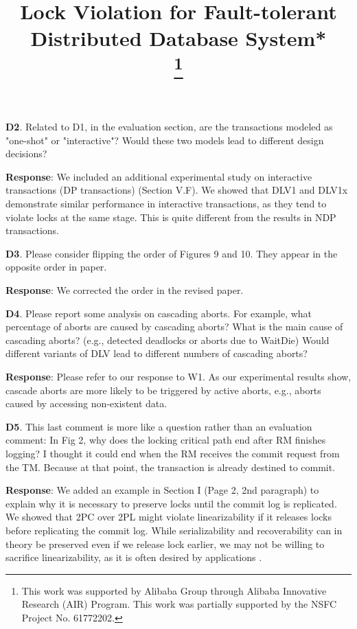 \documentclass[conference]{IEEEtran}
\begin{document}
\begin{frame}{\relax}
\textbf{D2}. Related to D1, in the evaluation section, are the transactions modeled as "one-shot" or "interactive"? Would these two models lead to different design decisions?

\textbf{Response}: We included an additional experimental study on interactive transactions (DP transactions) (Section V.F). We showed that DLV1 and DLV1x demonstrate similar performance in interactive transactions, as they tend to violate locks at the same stage. This is quite different from the results in NDP transactions.

\textbf{D3}. Please consider flipping the order of Figures 9 and 10. They appear in the opposite order in paper.

\textbf{Response}: We corrected the order in the revised paper.

\textbf{D4}. Please report some analysis on cascading aborts. For example, what percentage of aborts are caused by cascading aborts? What is the main cause of cascading aborts? (e.g., detected deadlocks or aborts due to WaitDie) Would different variants of DLV lead to different numbers of cascading aborts?

\textbf{Response}: Please refer to our response to W1. As our experimental results show, cascade aborts are more likely to be triggered by active aborts, e.g., aborts caused by accessing non-existent data. 

\textbf{D5}. This last comment is more like a question rather than an evaluation comment: In Fig 2, why does the locking critical path end after RM finishes logging? I thought it could end when the RM receives the commit request from the TM. Because at that point, the transaction is already destined to commit.

\textbf{Response}: We added an example in Section I (Page 2, 2nd paragraph) to explain why it is necessary to preserve locks until the commit log is replicated. We showed that 2PC over 2PL might violate linearizability if it releases locks before replicating the commit log. While serializability and recoverability can in theory be preserved even if we release lock earlier, we may not be willing to sacrifice linearizability, as it is often desired by applications .


\end{frame}%

\fi 

\title{Lock Violation for Fault-tolerant Distributed Database System*\\
\thanks{This work was supported by Alibaba Group through Alibaba Innovative Research (AIR) Program. This work was partially supported by the NSFC Project No. 61772202.
}
}
\end{document}
